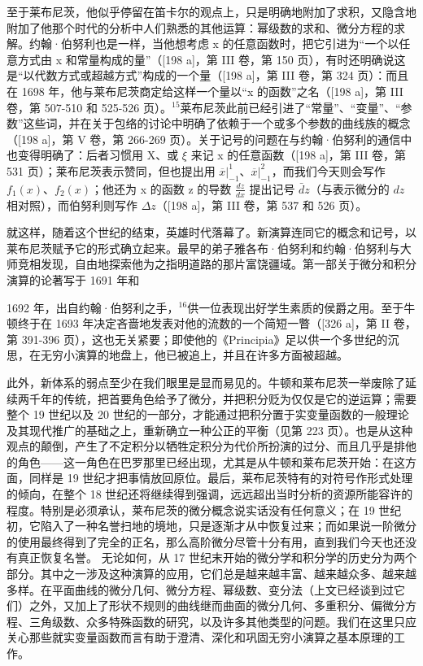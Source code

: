 至于莱布尼茨，他似乎停留在笛卡尔的观点上，只是明确地附加了求积，又隐含地附加了他那个时代的分析中人们熟悉的其他运算：幂级数的求和、微分方程的求解。约翰·伯努利也是一样，当他想考虑 x 的任意函数时，把它引进为“一个以任意方式由 x 和常量构成的量”（{[}198 a{]}，第 III 卷，第 150 页），有时还明确说这是“以代数方式或超越方式”构成的一个量（{[}198 a{]}，第 III 卷，第 324 页）：而且在 1698 年，他与莱布尼茨商定给这样一个量以“x 的函数”之名（{[}198 a{]}，第 III 卷，第 507-510 和 525-526 页）。\(^{15}\)莱布尼茨此前已经引进了“常量”、“变量”、“参数”这些词，并在关于包络的讨论中明确了依赖于一个或多个参数的曲线族的概念（{[}198 a{]}，第 V 卷，第 266-269 页）。关于记号的问题在与约翰·伯努利的通信中也变得明确了：后者习惯用 X、或 \(\xi\) 来记 x 的任意函数（{[}198 a{]}，第 III 卷，第 531 页）；莱布尼茨表示赞同，但也提出用 \(\overline{x}|_{-1}^{1}\)、\(\overline{x}|_{-1}^{2}\)，而我们今天则会写作 \(f_{1}(x)\)、\(f_{2}(x)\)；他还为 x 的函数 z 的导数 \(\frac{dz}{dx}\) 提出记号 \(\bar{d}z\)（与表示微分的 \(dz\) 相对照），而伯努利则写作 \(\Delta z\)（{[}198 a{]}，第 III 卷，第 537 和 526 页）。

就这样，随着这个世纪的结束，英雄时代落幕了。新演算连同它的概念和记号，以莱布尼茨赋予它的形式确立起来。最早的弟子雅各布·伯努利和约翰·伯努利与大师竞相发现，自由地探索他为之指明道路的那片富饶疆域。第一部关于微分和积分演算的论著写于 1691 年和

1692 年，出自约翰·伯努利之手，\(^{16}\)供一位表现出好学生素质的侯爵之用。至于牛顿终于在 1693 年决定吝啬地发表对他的流数的一个简短一瞥（{[}326 a{]}，第 II 卷，第 391-396 页），这也无关紧要；即使他的《Principia》足以供一个多世纪的沉思，在无穷小演算的地盘上，他已被追上，并且在许多方面被超越。

此外，新体系的弱点至少在我们眼里是显而易见的。牛顿和莱布尼茨一举废除了延续两千年的传统，把首要角色给予了微分，并把积分贬为仅仅是它的逆运算；需要整个 19 世纪以及 20 世纪的一部分，才能通过把积分置于实变量函数的一般理论及其现代推广的基础之上，重新确立一种公正的平衡（见第 223 页）。也是从这种观点的颠倒，产生了不定积分以牺牲定积分为代价所扮演的过分、而且几乎是排他的角色——这一角色在巴罗那里已经出现，尤其是从牛顿和莱布尼茨开始：在这方面，同样是 19 世纪才把事情放回原位。最后，莱布尼茨特有的对符号作形式处理的倾向，在整个 18 世纪还将继续得到强调，远远超出当时分析的资源所能容许的程度。特别是必须承认，莱布尼茨的微分概念说实话没有任何意义；在 19 世纪初，它陷入了一种名誉扫地的境地，只是逐渐才从中恢复过来；而如果说一阶微分的使用最终得到了完全的正名，那么高阶微分尽管十分有用，直到我们今天也还没有真正恢复名誉。
\relax{}
无论如何，从 17 世纪末开始的微分学和积分学的历史分为两个部分。其中之一涉及这种演算的应用，它们总是越来越丰富、越来越众多、越来越多样。在平面曲线的微分几何、微分方程、幂级数、变分法（上文已经谈到过它们）之外，又加上了形状不规则的曲线继而曲面的微分几何、多重积分、偏微分方程、三角级数、众多特殊函数的研究，以及许多其他类型的问题。我们在这里只应关心那些就实变量函数而言有助于澄清、深化和巩固无穷小演算之基本原理的工作。

